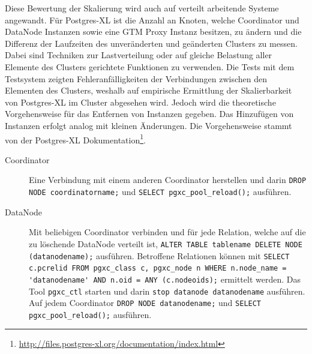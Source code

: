 Diese Bewertung der Skalierung wird auch auf verteilt arbeitende Systeme angewandt.
Für Postgres-XL ist die Anzahl an Knoten, welche Coordinator und DataNode Instanzen sowie eine GTM Proxy Instanz besitzen, zu ändern und die Differenz der Laufzeiten des unveränderten und geänderten Clusters zu messen.
Dabei sind Techniken zur Lastverteilung oder auf gleiche Belastung aller Elemente des Clusters gerichtete Funktionen zu verwenden.
Die Tests mit dem Testsystem zeigten Fehleranfälligkeiten der Verbindungen zwischen den Elementen des Clusters, weshalb auf empirische Ermittlung der Skalierbarkeit von Postgres-XL im Cluster abgesehen wird.
Jedoch wird die theoretische Vorgehensweise für das Entfernen von Instanzen gegeben.
Das Hinzufügen von Instanzen erfolgt analog mit kleinen Änderungen.
Die Vorgehensweise stammt von der Postgres-XL Dokumentation\footnote{\url{http://files.postgres-xl.org/documentation/index.html}}.
\begin{description}
\item[Coordinator] Eine Verbindung mit einem anderen Coordinator herstellen und darin \verb+DROP NODE coordinatorname;+ und \verb+SELECT pgxc_pool_reload();+ ausführen.
\item[DataNode] Mit beliebigen Coordinator verbinden und für jede Relation, welche auf die zu löschende DataNode verteilt ist, \verb+ALTER TABLE tablename DELETE NODE+\\\verb+(datanodename);+ ausführen. Betroffene Relationen können mit \verb+SELECT+\\\verb+c.pcrelid FROM pgxc_class c, pgxc_node n WHERE n.node_name =+\\\verb+'datanodename' AND n.oid = ANY (c.nodeoids);+ ermittelt werden. Das Tool \verb+pgxc_ctl+ starten und darin \verb+stop datanode datanodename+ ausführen. Auf jedem Coordinator \verb+DROP NODE datanodename;+ und \verb+SELECT+\\\verb+pgxc_pool_reload();+ ausführen.
\end{description}

